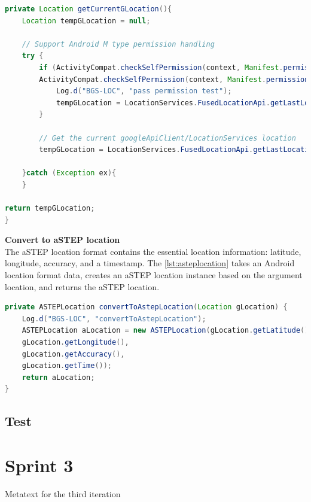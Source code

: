 \begin{lstlisting}[caption={getCurrentLocation},label={lst:getCurrentLocation},language=Java]
private Location getCurrentGLocation(){
	Location tempGLocation = null;

	// Support Android M type permission handling
	try {
		if (ActivityCompat.checkSelfPermission(context, Manifest.permission.ACCESS_FINE_LOCATION) != PackageManager.PERMISSION_GRANTED &&
		ActivityCompat.checkSelfPermission(context, Manifest.permission.ACCESS_COARSE_LOCATION) != PackageManager.PERMISSION_GRANTED) {
			Log.d("BGS-LOC", "pass permission test");
			tempGLocation = LocationServices.FusedLocationApi.getLastLocation(googleApiClient);
		}

		// Get the current googleApiClient/LocationServices location
		tempGLocation = LocationServices.FusedLocationApi.getLastLocation(googleApiClient);

	}catch (Exception ex){
	}

return tempGLocation;
}
\end{lstlisting}

\textbf{Convert to aSTEP location}\\
The aSTEP location format contains the essential location information: latitude, longitude, accuracy, and a timestamp.
The \ref{lst:asteplocation} takes an Android location format data, creates an aSTEP location instance based on the argument location, and returns the aSTEP location.

\begin{lstlisting}[caption={ASTEPLocation()},label={lst:asteplocation},language=Java]
private ASTEPLocation convertToAstepLocation(Location gLocation) {
	Log.d("BGS-LOC", "convertToAstepLocation");
	ASTEPLocation aLocation = new ASTEPLocation(gLocation.getLatitude(),
	gLocation.getLongitude(),
	gLocation.getAccuracy(),
	gLocation.getTime());
	return aLocation;
}
\end{lstlisting}





\section{Test}



\chapter{Sprint 3}
Metatext for the third iteration
